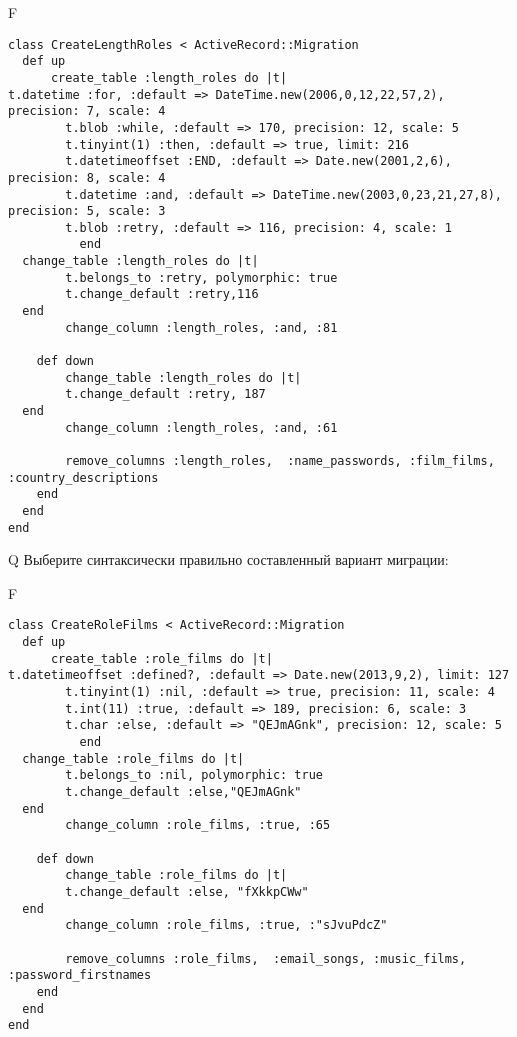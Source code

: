 F
\begin{verbatim}
class CreateLengthRoles < ActiveRecord::Migration
  def up
	  create_table :length_roles do |t|
t.datetime :for, :default => DateTime.new(2006,0,12,22,57,2), precision: 7, scale: 4
		t.blob :while, :default => 170, precision: 12, scale: 5
		t.tinyint(1) :then, :default => true, limit: 216
		t.datetimeoffset :END, :default => Date.new(2001,2,6), precision: 8, scale: 4
		t.datetime :and, :default => DateTime.new(2003,0,23,21,27,8), precision: 5, scale: 3
		t.blob :retry, :default => 116, precision: 4, scale: 1
		  end
  change_table :length_roles do |t|
		t.belongs_to :retry, polymorphic: true
 		t.change_default :retry,116
  end
 		change_column :length_roles, :and, :81
   
	def down
		change_table :length_roles do |t|
		t.change_default :retry, 187
  end
 		change_column :length_roles, :and, :61
   
		remove_columns :length_roles,  :name_passwords, :film_films, :country_descriptions 
    end 
  end
end

\end{verbatim}

Q
Выберите синтаксически правильно составленный вариант миграции:

F
\begin{verbatim}
class CreateRoleFilms < ActiveRecord::Migration
  def up
	  create_table :role_films do |t|
t.datetimeoffset :defined?, :default => Date.new(2013,9,2), limit: 127
		t.tinyint(1) :nil, :default => true, precision: 11, scale: 4
		t.int(11) :true, :default => 189, precision: 6, scale: 3
		t.char :else, :default => "QEJmAGnk", precision: 12, scale: 5
		  end
  change_table :role_films do |t|
		t.belongs_to :nil, polymorphic: true
 		t.change_default :else,"QEJmAGnk"
  end
 		change_column :role_films, :true, :65
   
	def down
		change_table :role_films do |t|
		t.change_default :else, "fXkkpCWw"
  end
 		change_column :role_films, :true, :"sJvuPdcZ"
   
		remove_columns :role_films,  :email_songs, :music_films, :password_firstnames 
    end 
  end
end

\end{verbatim}

